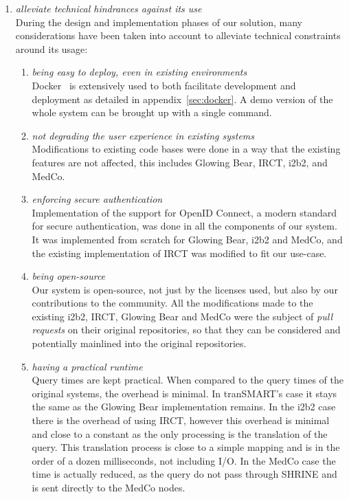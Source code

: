 \begin{enumerate}
    \item \emph{alleviate technical hindrances against its use} \\
    During the design and implementation phases of our solution, many considerations have been taken into account to alleviate technical constraints around its usage:
    \begin{enumerate}
        \item \emph{being easy to deploy, even in existing environments} \\
        Docker~\cite{merkel2014docker} is extensively used to both facilitate development and deployment as detailed in appendix~\ref{sec:docker}.
        A demo version of the whole system can be brought up with a single command.
        
        \item \emph{not degrading the user experience in existing systems} \\
        Modifications to existing code bases were done in a way that the existing features are not affected, this includes Glowing Bear, IRCT, i2b2, and MedCo.
        
        \item \emph{enforcing secure authentication} \\
        Implementation of the support for OpenID Connect, a modern standard for secure authentication, was done in all the components of our system.
        It was implemented from scratch for Glowing Bear, i2b2 and MedCo, and the existing implementation of IRCT was modified to fit our use-case.
        
        \item \emph{being open-source} \\
        Our system is open-source, not just by the licenses used, but also by our contributions to the community.
        All the modifications made to the existing i2b2, IRCT, Glowing Bear and MedCo were the subject of \emph{pull requests} on their original repositories, so that they can be considered and potentially mainlined into the original repositories.
        
        \item \emph{having a practical runtime} \\
        Query times are kept practical.
        When compared to the query times of the original systems, the overhead is minimal.
        In tranSMART's case it stays the same as the Glowing Bear implementation remains.
        In the i2b2 case there is the overhead of using IRCT, however this overhead is minimal and close to a constant as the only processing is the translation of the query. 
        This translation process is close to a simple mapping and is in the order of a dozen milliseconds, not including I/O.
        In the MedCo case the time is actually reduced, as the query do not pass through SHRINE and is sent directly to the MedCo nodes.
        
        
    \end{enumerate}
\end{enumerate}


